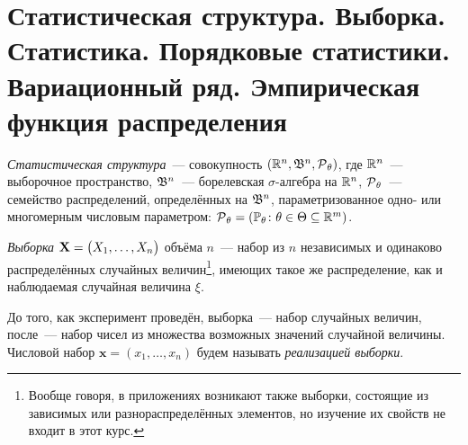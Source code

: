 \section{Статистическая структура. Выборка. Статистика. Порядковые статистики. Вариационный ряд. Эмпирическая функция распределения}

\begin{defn}
    \textit{Статистическая структура}~--- совокупность $(\mathbb{R}^n, \mathfrak{B}^n, \operatorname{\mathcal{P}}_\theta)$, 
    где $\mathbb{R}^n$~--- выборочное пространство, 
    $\mathfrak{B}^{n}$~--- борелевская $\sigma$-алгебра на $\mathbb{R}^n$, $\operatorname{\mathcal{P}}_\theta$~--- семейство распределений, 
    определённых на $\mathfrak{B}^n$, параметризованное одно- или многомерным числовым параметром: 
    $\operatorname{\mathcal{P}}_\theta = (\operatorname{\mathbb{P}}_{\theta} \colon \theta \in \Theta \subseteq \mathbb{R}^{m})$.
\end{defn}

\begin{defn}
    \textit{Выборка} $\mathbf{X}= \bigl(X_1, \ldots, X_n \bigr)$ объёма $n$~--- набор из $n$ независимых и одинаково распределённых случайных величин\footnote{Вообще говоря, в приложениях возникают также выборки, состоящие из зависимых или разнораспределённых элементов, но изучение их свойств не входит в этот курс.}, имеющих такое же распределение, как и наблюдаемая случайная величина $\xi$.
\end{defn}

До того, как эксперимент проведён, выборка~--- набор случайных величин, после~--- набор чисел из множества возможных значений случайной величины. 
Числовой набор $\boldsymbol{x} = (x_1, \ldots, x_n)$ будем называть \textit{реализацией выборки}.

